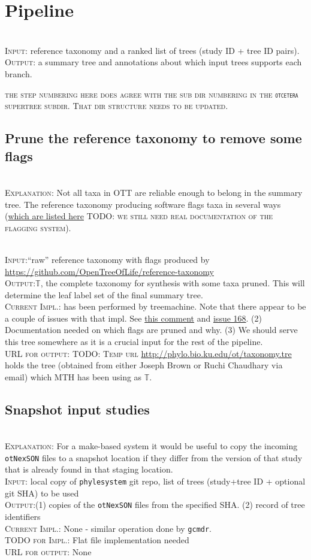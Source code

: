 \documentclass[11pt]{article}
\newcommand{\otc}[0]{\texttt{otcetera}\xspace}
\newcommand{\nexson}[0]{\texttt{otNexSON}\xspace}
\newcommand{\gcmdr}[0]{\texttt{gcmdr}\xspace}
\newcommand{\stepExplanation}[0]{\\\noindent\textsc{Explanation}:\xspace}
\newcommand{\stepInput}[0]{\\\noindent\textsc{Input}:\xspace}
\newcommand{\stepOutput}[0]{\\\noindent\textsc{Output}:\xspace}
\newcommand{\currImpl}[0]{\\\noindent\textsc{Current Impl.}:\xspace}
\newcommand{\implTODO}[0]{\\\noindent\textsc{TODO for Impl.}:\xspace}
\newcommand{\currURL}[0]{\\\noindent\textsc{URL for output}:\xspace}
\newcommand{\comment}[1]{{\color{red} \textsc{#1}}\xspace}
\newcommand{\TODO}[1]{\comment{TODO: #1}}
\newcommand{\taxonomy}[0]{\ensuremath{\mathbb{T}}\xspace}
\begin{document}
\section{Pipeline}
\stepInput reference taxonomy and a ranked list of trees (study ID + tree ID pairs).
\stepOutput a summary tree and annotations about which input trees supports each branch.

\comment{the step numbering here does  agree with the sub dir numbering in
    the \otc supertree subdir. That dir structure needs to be updated.}

\subsection{Prune the reference taxonomy to remove some flags}
\stepExplanation Not all taxa in OTT are reliable enough to belong in the 
    summary tree.
The reference taxonomy producing software flags taxa in several ways 
(\href{https://github.com/OpenTreeOfLife/reference-taxonomy/wiki/taxon-flags}{which are listed here}
\TODO{we still need real documentation of the flagging system}).

\stepInput ``raw'' reference taxonomy with flags produced by \url{https://github.com/OpenTreeOfLife/reference-taxonomy}
\stepOutput $\taxonomy$, the complete taxonomy for synthesis with some taxa pruned.
This will determine the leaf label set of the final summary tree.
\currImpl has been performed by treemachine. Note that there appear to be
    a couple of issues with that impl. See 
\href{https://github.com/OpenTreeOfLife/treemachine/commit/48211803f137ad0b7c096c28d1c10d32f671194f}{this comment} and
\href{https://github.com/OpenTreeOfLife/treemachine/issues/168}{issue 168}.
(2) Documentation needed on which flags are pruned and why.
(3) We should serve this tree somewhere as it is a crucial input for the rest of the pipeline.
\currURL \TODO{Temp url} \url{http://phylo.bio.ku.edu/ot/taxonomy.tre} holds the tree (obtained
    from either Joseph Brown or Ruchi Chaudhary via email) which MTH has been using as \taxonomy.

\subsection{Snapshot input studies}
\stepExplanation For a make-based system it would be useful to copy the incoming \nexson files
    to a snapshot location if they differ from the version of that study that is already found
    in that staging location.
\stepInput local copy of \texttt{phylesystem} git repo, list of trees (study+tree ID + optional git SHA) to be used
\stepOutput (1) copies of the \nexson files from the specified SHA. (2) record of tree identifiers
\currImpl None - similar operation done by \gcmdr.
\implTODO Flat file implementation needed
\currURL None
 
\end{document}
